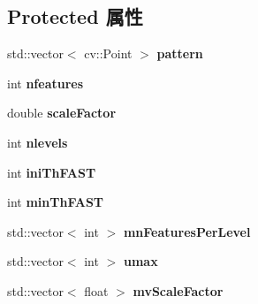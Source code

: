 \subsection*{Protected 属性}
\begin{DoxyCompactItemize}
\item 
\hypertarget{classORB__SLAM2_1_1ORBextractor_a3a2e4f9495adf52773613987f09ae9d9}{std\-::vector$<$ cv\-::\-Point $>$ {\bfseries pattern}}\label{classORB__SLAM2_1_1ORBextractor_a3a2e4f9495adf52773613987f09ae9d9}

\item 
\hypertarget{classORB__SLAM2_1_1ORBextractor_ab74b569810b3d3288c642cc48fd65c4c}{int {\bfseries nfeatures}}\label{classORB__SLAM2_1_1ORBextractor_ab74b569810b3d3288c642cc48fd65c4c}

\item 
\hypertarget{classORB__SLAM2_1_1ORBextractor_a13b9c3883b3fb19cb756f841cb948908}{double {\bfseries scale\-Factor}}\label{classORB__SLAM2_1_1ORBextractor_a13b9c3883b3fb19cb756f841cb948908}

\item 
\hypertarget{classORB__SLAM2_1_1ORBextractor_aaf5c435dfb3fb2220c3847cd5f536e2f}{int {\bfseries nlevels}}\label{classORB__SLAM2_1_1ORBextractor_aaf5c435dfb3fb2220c3847cd5f536e2f}

\item 
\hypertarget{classORB__SLAM2_1_1ORBextractor_a8997b404b50b563ffd2aea6b8130dd2a}{int {\bfseries ini\-Th\-F\-A\-S\-T}}\label{classORB__SLAM2_1_1ORBextractor_a8997b404b50b563ffd2aea6b8130dd2a}

\item 
\hypertarget{classORB__SLAM2_1_1ORBextractor_a72fcac0df56c0bfe430475082df56823}{int {\bfseries min\-Th\-F\-A\-S\-T}}\label{classORB__SLAM2_1_1ORBextractor_a72fcac0df56c0bfe430475082df56823}

\item 
\hypertarget{classORB__SLAM2_1_1ORBextractor_a2eef0343b411bff8681782115a279e2a}{std\-::vector$<$ int $>$ {\bfseries mn\-Features\-Per\-Level}}\label{classORB__SLAM2_1_1ORBextractor_a2eef0343b411bff8681782115a279e2a}

\item 
\hypertarget{classORB__SLAM2_1_1ORBextractor_a8c75fd715b20fbaf61fce11e03729901}{std\-::vector$<$ int $>$ {\bfseries umax}}\label{classORB__SLAM2_1_1ORBextractor_a8c75fd715b20fbaf61fce11e03729901}

\item 
\hypertarget{classORB__SLAM2_1_1ORBextractor_a9432037b97eccc06715383d8c34965e9}{std\-::vector$<$ float $>$ {\bfseries mv\-Scale\-Factor}}\label{classORB__SLAM2_1_1ORBextractor_a9432037b97eccc06715383d8c34965e9}


\end{DoxyCompactItemize}
